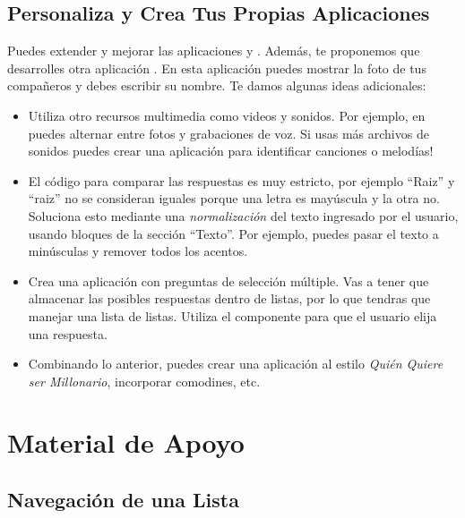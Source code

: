 \subsection*{Personaliza y Crea Tus Propias Aplicaciones}

Puedes extender y mejorar las aplicaciones  y
. Además, te proponemos que desarrolles otra aplicación
. En esta aplicación puedes
mostrar la foto de tus compañeros y debes escribir su nombre. Te damos
algunas ideas adicionales:

\begin{itemize}

\item Utiliza otro recursos multimedia como videos y sonidos. Por
  ejemplo, en  puedes alternar
  entre fotos y grabaciones de voz. Si usas más archivos de sonidos
  puedes crear una aplicación para identificar canciones o melodías!

\item El código para comparar las respuestas es muy estricto, por
  ejemplo ``Raiz'' y ``raiz'' no se consideran iguales porque una
  letra es mayúscula y la otra no. Soluciona esto mediante una
  \emph{normalización} del texto ingresado por el usuario, usando
  bloques de la sección ``Texto''. Por ejemplo, puedes pasar el texto
  a minúsculas y remover todos los acentos.

\item Crea una aplicación con preguntas de selección múltiple. Vas a
  tener que almacenar las posibles respuestas dentro de listas, por lo
  que tendras que manejar una lista de listas. Utiliza el componente
   para que el usuario elija una respuesta.

\item Combinando lo anterior, puedes crear una aplicación al estilo
  \emph{Quién Quiere ser Millonario}, incorporar comodines, etc.

\end{itemize}

\section{Material de Apoyo}

\subsection*{Navegación de una Lista}

